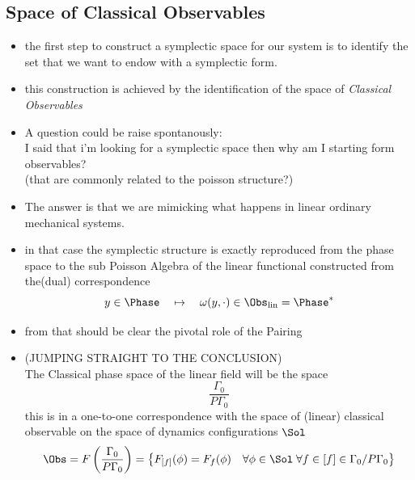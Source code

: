 \documentclass[a4paper,11pt]{scrartcl}
\begin{document}
	\subsection{Space of Classical Observables}
	\begin{itemize}
		\item the first step to construct a symplectic space for our system is to identify the set that we want to endow with a symplectic form.
		\item this construction is achieved by the identification of the space of \emph{Classical Observables}
		\item A question could be raise spontanously:\\
		I said that i'm looking for a symplectic space then why am I starting form observables? \\
		(that are commonly related to the poisson structure?)
		\item The answer is that we are mimicking what happens in linear ordinary mechanical systems.
		\item in that case the symplectic structure is exactly reproduced from the phase space to the sub Poisson Algebra of the linear functional constructed from the(dual) correspondence
		$$ y \in \Phase \quad \mapsto \quad \omega(y,\cdot) \in \Obs_{\textrm{lin}} = \Phase^* $$
		\item from that should be clear the pivotal role of the Pairing
		\item (JUMPING STRAIGHT TO THE CONCLUSION)\\
		The Classical phase space of the linear field will be the space
		$$\frac{\Gamma_0}{P\Gamma_0} $$
		this is in a one-to-one correspondence with the space of (linear) classical observable on the space of dynamics configurations $\Sol$
		$$ \Obs = F\left( \frac{\Gamma_0}{P\Gamma_0}  \right) =\left\{ F_{[f]}(\phi) = F_f(\phi) \quad \forall \phi \in \Sol \; \forall f \in [f] \in \Gamma_0/P\Gamma_0 \right\} $$
	\end{itemize}
\end{document}
